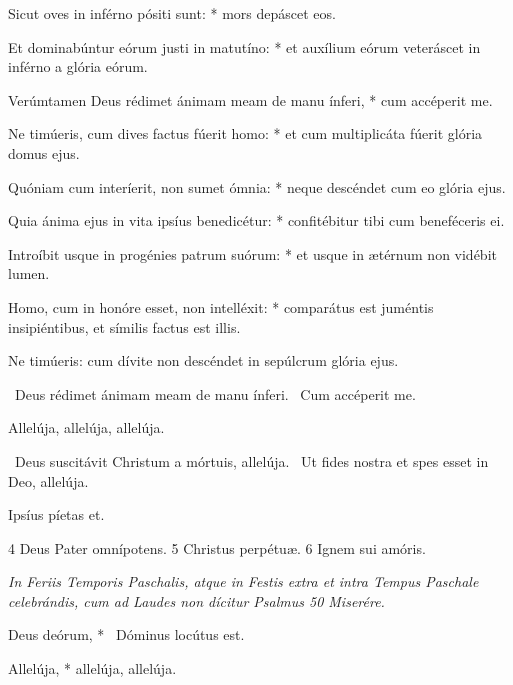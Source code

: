 Sicut oves in inférno pósiti sunt: * mors depáscet eos.

Et dominabúntur eórum justi in matutíno: * et auxílium eórum veteráscet in inférno a glória eórum.

Verúmtamen Deus rédimet ánimam meam de manu ínferi, * cum accéperit me.

Ne timúeris, cum dives factus fúerit homo: * et cum multiplicáta fúerit glória domus ejus.

Quóniam cum interíerit, non sumet ómnia: * neque descéndet cum eo glória ejus.

Quia ánima ejus in vita ipsíus benedicétur: * confitébitur tibi cum beneféceris ei.

Introíbit usque in progénies patrum suórum: * et usque in ætérnum non vidébit lumen.

Homo, cum in honóre esset, non intelléxit: * comparátus est juméntis insipiéntibus, et símilis factus est illis.

 Ne timúeris: cum dívite non descéndet in sepúlcrum glória ejus.



\V\ Deus rédimet ánimam meam de manu ínferi. \R\ Cum accéperit me.



 Allelúja, allelúja, allelúja.

\V\ Deus suscitávit Christum a mórtuis, allelúja. \R\ Ut fides nostra et spes esset in Deo, allelúja.

 Ipsíus píetas et.

 4 Deus Pater omnípotens. 5 Christus perpétuæ. 6 Ignem sui amóris.



\textit{In Feriis Temporis Paschalis, atque in Festis extra et intra Tempus Paschale celebrándis, cum ad Laudes non dícitur Psalmus 50 Miserére.}


 Deus deórum, * \textdagger\ Dóminus locútus est. \textdaggerdbl


 Allelúja, * allelúja, allelúja.

